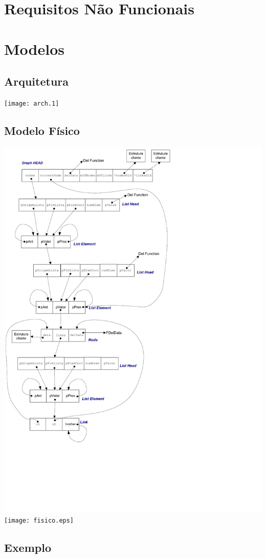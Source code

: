 \documentclass[a4paper,12pt]{article}
\begin{document}
\section{Requisitos Não Funcionais}

\section{Modelos}
\subsection{Arquitetura}
\texttt{[image: arch.1]}

\subsection{Modelo Físico}
\ifpdf
\includegraphics{fisico.pdf}
\else
\texttt{[image: fisico.eps]}
\fi

\subsection{Exemplo}
\ifpdf
\else
\fi
\end{document}
